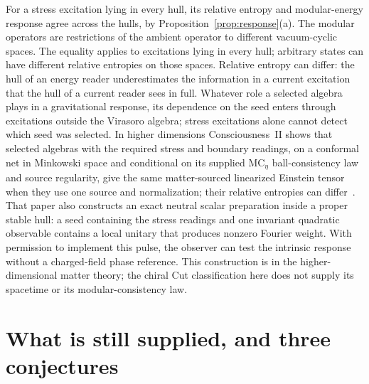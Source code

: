 \documentclass[12pt]{article}
\theoremstyle{definition}
\theoremstyle{remark}
\begin{document}
For a stress excitation lying in every hull, its relative entropy and modular-energy
response agree across the hulls, by Proposition~\ref{prop:response}(a). The modular
operators are restrictions of the ambient operator to different vacuum-cyclic spaces.
The equality applies to excitations lying in every hull; arbitrary states can have
different relative entropies on those spaces.
Relative entropy can differ: the hull of an energy reader underestimates the information in a current
excitation that the hull of a current reader sees in full. Whatever role a selected
algebra plays in a gravitational response, its dependence on the seed enters through
excitations outside the Virasoro algebra; stress excitations alone cannot detect which
seed was selected. In higher dimensions Consciousness~II shows that selected
algebras with the required stress and boundary readings, on a conformal
net in Minkowski space and conditional on its supplied
$\mathrm{MC}_\eta$ ball-consistency law and source regularity, give the same
matter-sourced linearized Einstein tensor when they use one source and normalization; their relative entropies can differ~\cite{PaperCII}. That paper also constructs an exact neutral scalar preparation
inside a proper stable hull: a seed containing the stress readings and one invariant
quadratic observable contains a local unitary that produces nonzero Fourier weight.
With permission to implement this pulse, the observer can test the intrinsic response
without a charged-field phase reference. This construction is in the higher-dimensional
matter theory; the chiral Cut classification here does not supply its spacetime or
its modular-consistency law.

\section{What is still supplied, and three conjectures}\label{sec:open}
\end{document}
